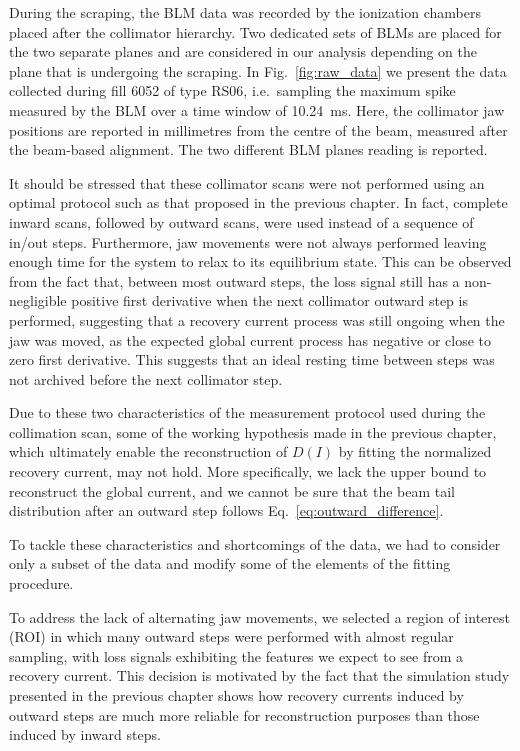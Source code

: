 During the scraping, the BLM data was recorded by the ionization chambers placed after the collimator hierarchy. Two dedicated sets of BLMs are placed for the two separate planes and are considered in our analysis depending on the plane that is undergoing the scraping. In Fig.~\ref{fig:raw_data} we present the data collected during fill 6052 of type RS06, i.e.\ sampling the maximum spike measured by the BLM over a time window of \SI{10.24}{ms}. Here, the collimator jaw positions are reported in millimetres from the centre of the beam, measured after the beam-based alignment. The two different BLM planes reading is reported.

It should be stressed that these collimator scans were not performed using an optimal protocol such as that proposed in the previous chapter. In fact, complete inward scans, followed by outward scans, were used instead of a sequence of in/out steps. Furthermore, jaw movements were not always performed leaving enough time for the system to relax to its equilibrium state. This can be observed from the fact that, between most outward steps, the loss signal still has a non-negligible positive first derivative when the next collimator outward step is performed, suggesting that a recovery current process was still ongoing when the jaw was moved, as the expected global current process has negative or close to zero first derivative. This suggests that an ideal resting time between steps was not archived before the next collimator step.

Due to these two characteristics of the measurement protocol used during the collimation scan, some of the working hypothesis made in the previous chapter, which ultimately enable the reconstruction of $D(I)$ by fitting the normalized recovery current, may not hold. More specifically, we lack the upper bound to reconstruct the global current, and we cannot be sure that the beam tail distribution after an outward step follows Eq.~\eqref{eq:outward_difference}.

To tackle these characteristics and shortcomings of the data, we had to consider only a subset of the data and modify some of the elements of the fitting procedure. 

To address the lack of alternating jaw movements, we selected a region of interest (ROI) in which many outward steps were performed with almost regular sampling, with loss signals exhibiting the features we expect to see from a recovery current. This decision is motivated by the fact that the simulation study presented in the previous chapter shows how recovery currents induced by outward steps are much more reliable for reconstruction purposes than those induced by inward steps. 

